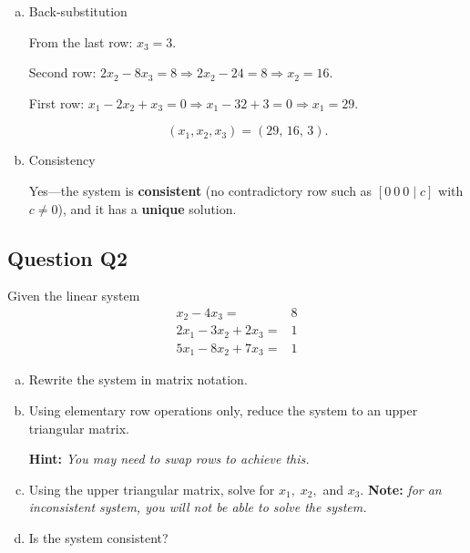 \documentclass[a4paper,11pt,reqno]{amsart}
\numberwithin{equation}{section}
\begin{document}
\begin{center}
{{\begin{enumerate}[a)]
This is upper triangular.

\item Back-substitution

From the last row: $x_3=3$.

Second row: $2x_2-8x_3=8 \Rightarrow 2x_2-24=8 \Rightarrow x_2=16$.

First row: $x_1-2x_2+x_3=0 \Rightarrow x_1-32+3=0 \Rightarrow x_1=29$.

$$
\boxed{(x_1,x_2,x_3)=(29,\,16,\,3)}.
$$

\item Consistency

Yes—the system is \textbf{consistent} (no contradictory row such as $[0\ 0\ 0\mid c]$ with $c\neq 0$), and it has a \textbf{unique} solution.
\end{enumerate}
}}
\end{center}


\subsection{Question Q2}\label{sec:q2}
Given the linear system
    \begin{align*}
        x_2 - 4x_3 =& 8\\
           2x_1 - 3x_2 + 2x_3  =& 1\\
         5x_1 - 8x_2 + 7x_3 =& 1
    \end{align*}
\begin{enumerate}[a)]
    \item Rewrite the system in matrix notation.
    \item Using elementary row operations only, reduce the system to an upper triangular matrix.
    
    \textbf{Hint:} \emph{You may need to swap rows to achieve this.}
    
    \item Using the upper triangular matrix, solve for \(x_1,\; x_2,\) and \(x_3\).
    \textbf{Note:} \emph{for an inconsistent system, you will not be able to solve the system.}
    
    \item Is the system consistent?
\end{enumerate}
\end{document}
